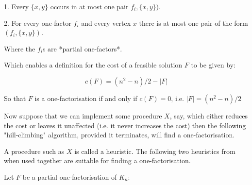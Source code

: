 \documentclass[
  11pt,
  a4paper]{book}\usepackage[]{graphicx}\usepackage[]{xcolor}
\begin{document}
  1. Every $\{x, y\}$ occurs in at most one pair
  $f_i, \{x, y\})$.

  2. For every one-factor $f_i$ and every vertex $x$ there
     is at most one pair of the form $(f_i, \{x, y\})$.

Where the $f_i$s are *partial one-factors*.

Which enables a definition for the cost of a feasible
solution $F$ to be given by:

$$c(F) = (n^2 - n)/2 - |F|$$

So that $F$ is a one-factorisation if and only if
$c(F) = 0$, i.e. $|F| = (n^2 - n)/2$

Now suppose that we can implement some procedure $X$, say,
which either reduces the cost or leaves it unaffected
(i.e. it never increases the cost) then the following
"hill-climbing" algorithm, provided it terminates,
will find a one-factorisation.

\begin{algorithm}[H]
\end{algorithm}

A procedure such as $X$ is called a heuristic.
The following two heuristics from
\cite{dinitzHillClimbingAlgorithmConstruction1987}
when used together are suitable for finding a
one-factorisation.

Let $F$ be a partial one-factorisation of $K_n$:

\begin{algorithm}[H]
\caption{$H_1$}
\end{algorithm}

\begin{algorithm}[H]
\caption{$H_2$}
\end{algorithm}
\end{document}
